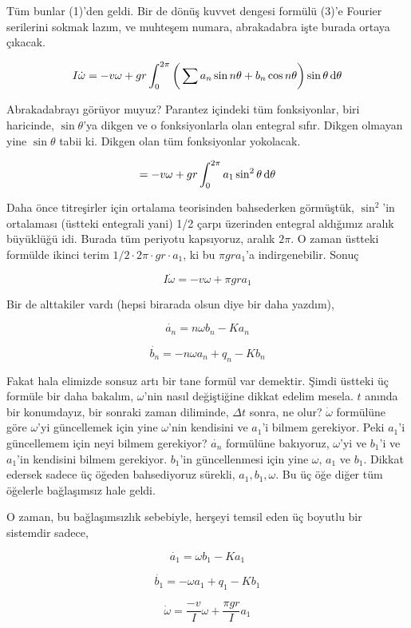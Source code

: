 \documentclass[12pt,fleqn]{article}\usepackage{../../common}
\begin{document}
Tüm bunlar (1)'den geldi. Bir de dönüş kuvvet dengesi formülü (3)'e Fourier
serilerini sokmak lazım, ve muhteşem numara, abrakadabra işte burada ortaya
çıkacak. 

$$ 
I \dot{\omega} = - v \omega + gr \int_{0}^{2\pi} 
\bigg(\sum a_n \sin n\theta + b_n \cos n\theta \bigg) \sin\theta \,\mathrm{d} \theta
$$

Abrakadabrayı görüyor muyuz? Parantez içindeki tüm fonksiyonlar, biri
haricinde, $\sin\theta$'ya dikgen ve o fonksiyonlarla olan entegral
sıfır. Dikgen olmayan yine $\sin\theta$ tabii ki. Dikgen olan tüm
fonksiyonlar yokolacak.

$$   = - v \omega + gr \int_{0}^{2\pi} a_1 \sin^2 \theta\,\mathrm{d}\theta $$

Daha önce titreşirler için ortalama teorisinden bahsederken görmüştük,
$\sin^2$'in ortalaması (üstteki entegrali yani) 1/2 çarpı üzerinden
entegral aldığımız aralık büyüklüğü idi. Burada tüm periyotu kapsıyoruz,
aralık $2\pi$. O zaman üstteki formülde ikinci terim $1/2 \cdot 2\pi \cdot gr \cdot a_1$, 
ki bu $\pi gr a_1$'a indirgenebilir. Sonuç

$$ I \dot{\omega} = -v \omega + \pi gr a_1 $$

Bir de alttakiler vardı (hepsi birarada olsun diye bir daha yazdım),

$$ 
\dot{a_n} = n \omega b_n - K a_n 
$$

$$ 
\dot{b_n} = -n \omega a_n + q_n - K b_n 
$$

Fakat hala elimizde sonsuz artı bir tane formül var demektir. Şimdi üstteki
üç formüle bir daha bakalım, $\omega$'nin nasıl değiştiğine dikkat edelim
mesela. $t$ anında bir konumdayız, bir sonraki zaman diliminde, $\Delta t$
sonra, ne olur? $\dot{\omega}$ formülüne göre $\omega$'yi güncellemek için
yine $\omega$'nin kendisini ve $a_1$'i bilmem gerekiyor. Peki $a_1$'i
güncellemem için neyi bilmem gerekiyor? $\dot{a_n}$ formülüne bakıyoruz,
$\omega$'yi ve $b_1$'i ve $a_1$'in kendisini bilmem gerekiyor. $b_1$'in
güncellenmesi için yine $\omega$, $a_1$ ve $b_1$. Dikkat edersek sadece üç
öğeden bahsediyoruz sürekli, $a_1,b_1,\omega$. Bu üç öğe diğer tüm öğelerle
bağlaşımsız hale geldi. 

O zaman, bu bağlaşımsızlık sebebiyle, herşeyi temsil eden üç boyutlu bir
sistemdir sadece, 

$$ \dot{a_1} = \omega b_1 - K a_1 $$

$$ \dot{b_1} = -\omega a_1 + q_1 - Kb_1 $$

$$ \dot{\omega} = \frac{-v}{I}\omega + \frac{\pi gr}{I} a_1 $$
\end{document}
